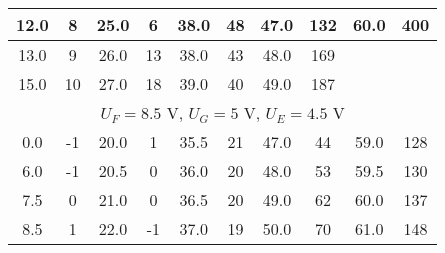 \begin{table*}
\begin{ruledtabular}
\begin{tabular}{|cccccccccc|}
        \multicolumn{1}{|c|}{12.0}      & \multicolumn{1}{c|}{8}          & \multicolumn{1}{c|}{25.0}      & \multicolumn{1}{c|}{6}          & \multicolumn{1}{c|}{38.0}      & \multicolumn{1}{c|}{48}         & \multicolumn{1}{c|}{47.0}      & \multicolumn{1}{c|}{132}        & \multicolumn{1}{c|}{60.0}      & 400        \\ \hline
        \multicolumn{1}{|c|}{13.0}      & \multicolumn{1}{c|}{9}          & \multicolumn{1}{c|}{26.0}      & \multicolumn{1}{c|}{13}         & \multicolumn{1}{c|}{38.0}      & \multicolumn{1}{c|}{43}         & \multicolumn{1}{c|}{48.0}      & \multicolumn{1}{c|}{169}        & \multicolumn{1}{c|}{}          &            \\ \hline
        \multicolumn{1}{|c|}{15.0}      & \multicolumn{1}{c|}{10}         & \multicolumn{1}{c|}{27.0}      & \multicolumn{1}{c|}{18}         & \multicolumn{1}{c|}{39.0}      & \multicolumn{1}{c|}{40}         & \multicolumn{1}{c|}{49.0}      & \multicolumn{1}{c|}{187}        & \multicolumn{1}{c|}{}          &            \\ \hline
        \multicolumn{10}{|c|}{$U_F = 8.5$ V,   $U_{G} = 5$ V, $U_E=4.5$ V}                                                                                                                                                                                                                                                       \\ \hline
        \multicolumn{1}{|c|}{0.0}       & \multicolumn{1}{c|}{-1}         & \multicolumn{1}{c|}{20.0}      & \multicolumn{1}{c|}{1}          & \multicolumn{1}{c|}{35.5}      & \multicolumn{1}{c|}{21}         & \multicolumn{1}{c|}{47.0}      & \multicolumn{1}{c|}{44}         & \multicolumn{1}{c|}{59.0}      & 128        \\ \hline
        \multicolumn{1}{|c|}{6.0}       & \multicolumn{1}{c|}{-1}         & \multicolumn{1}{c|}{20.5}      & \multicolumn{1}{c|}{0}          & \multicolumn{1}{c|}{36.0}      & \multicolumn{1}{c|}{20}         & \multicolumn{1}{c|}{48.0}      & \multicolumn{1}{c|}{53}         & \multicolumn{1}{c|}{59.5}      & 130        \\ \hline
        \multicolumn{1}{|c|}{7.5}       & \multicolumn{1}{c|}{0}          & \multicolumn{1}{c|}{21.0}      & \multicolumn{1}{c|}{0}          & \multicolumn{1}{c|}{36.5}      & \multicolumn{1}{c|}{20}         & \multicolumn{1}{c|}{49.0}      & \multicolumn{1}{c|}{62}         & \multicolumn{1}{c|}{60.0}      & 137        \\ \hline
        \multicolumn{1}{|c|}{8.5}       & \multicolumn{1}{c|}{1}          & \multicolumn{1}{c|}{22.0}      & \multicolumn{1}{c|}{-1}         & \multicolumn{1}{c|}{37.0}      & \multicolumn{1}{c|}{19}         & \multicolumn{1}{c|}{50.0}      & \multicolumn{1}{c|}{70}         & \multicolumn{1}{c|}{61.0}      & 148        \\ \hline

\end{tabular}
\end{ruledtabular}
\end{table*}
